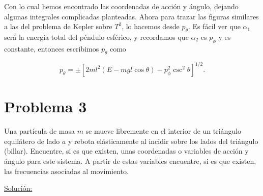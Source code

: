 \documentclass[a4paper,10pt]{article}
\numberwithin{equation}{section}
\begin{document}
Con lo cual hemos encontrado las coordenadas de acción y ángulo, dejando algunas 
integrales complicadas planteadas. Ahora para trazar las figuras similares a las 
del problema de Kepler sobre $T^2$, lo hacemos desde $p_\theta$. Es fácil ver que 
$\alpha_1$ será la energía total del péndulo esférico, y recordamos que $\alpha_2$ 
es $p_\phi$ y es constante, entonces escribimos $p_\theta$ como 

\begin{equation}
 p_\theta = \pm \left[
 2ml^2(E - mgl\cos{\theta}) -  p_\phi^2\csc^2{\theta}\right]^{1/2}.
\end{equation}



\section{Problema 3}

Una partícula de masa $m$ se mueve libremente en el interior de un triángulo  
equilátero de lado $a$ y rebota elásticamente al incidir sobre los lados del triángulo 
(billar). Encuentre, si es que existen, unas coordenadas o variables de acción 
y ángulo para este sistema. A partir de estas variables encuentre, si es que existen,
las frecuencias asociadas al movimiento. 

\vspace{.3cm}

\underline{Solución:} \vspace{.3cm}
\end{document}
